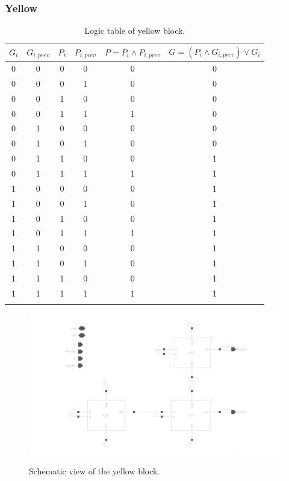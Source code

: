 \subsubsection{Yellow}

\begin{table}[H]
  \caption{Logic table of yellow block.}
  \centering
  \begin{tabular}{cccc|cc}
    \toprule
    $G_i$ & $G_{i,prev}$ & $P_i$ & $P_{i,prev}$ & $P=P_i \wedge P_{i,prev}$ & $G=(P_i \wedge G_{i,prev}) \vee G_i$ \\
    \midrule
    0 & 0 & 0 & 0 & 0 & 0 \\
    0 & 0 & 0 & 1 & 0 & 0 \\
    0 & 0 & 1 & 0 & 0 & 0 \\
    0 & 0 & 1 & 1 & 1 & 0 \\
    0 & 1 & 0 & 0 & 0 & 0 \\
    0 & 1 & 0 & 1 & 0 & 0 \\
    0 & 1 & 1 & 0 & 0 & 1 \\
    0 & 1 & 1 & 1 & 1 & 1 \\
    1 & 0 & 0 & 0 & 0 & 1 \\
    1 & 0 & 0 & 1 & 0 & 1 \\
    1 & 0 & 1 & 0 & 0 & 1 \\
    1 & 0 & 1 & 1 & 1 & 1 \\
    1 & 1 & 0 & 0 & 0 & 1 \\
    1 & 1 & 0 & 1 & 0 & 1 \\
    1 & 1 & 1 & 0 & 0 & 1 \\
    1 & 1 & 1 & 1 & 1 & 1 \\
    \bottomrule
    \label{tab:yellow}
  \end{tabular}
\end{table}

\begin{figure}[H]
  \centering
  \captionsetup{justification=centering}
  {\includegraphics[width=1.3\textwidth]{../figures/yellow}}
  \caption{Schematic view of the yellow block.} \label{fig:yellow}
\end{figure}

